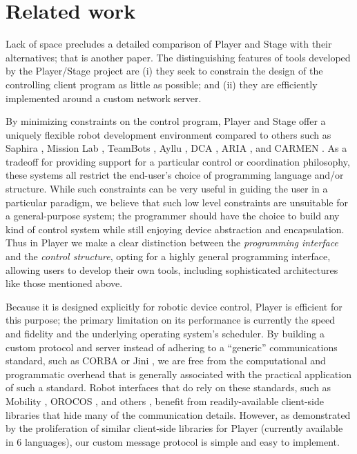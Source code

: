 \documentclass[a4paper]{ICAR2003}
\begin{document}
\section{Related work}
Lack of space precludes a detailed comparison of Player and Stage with
their alternatives; that is another paper. The distinguishing features of
tools developed by the Player/Stage project are (i) they seek to constrain
the design of the controlling client program as little as possible; and
(ii) they are efficiently implemented around a custom network server.

By minimizing constraints on the control program, Player and Stage offer a
uniquely flexible robot development environment compared to others such as
Saphira \cite{Konolige97}, Mission Lab \cite{MacKenzieArkinCameron97}, TeamBots
\cite{balch98}, Ayllu \cite{Werger00}, DCA \cite{PeterssonAustinChristensen01},
ARIA \cite{ARIA}, and CARMEN \cite{ThrunFoxBurgardDellaert01}.  As a tradeoff
for providing support for a particular control or coordination philosophy,
these systems all restrict the end-user's choice of programming language
and/or structure.  While such constraints can be very useful in guiding the
user in a particular paradigm, we believe that such low level constraints
are unsuitable for a general-purpose system; the programmer should have
the choice to build any kind of control system while still enjoying device
abstraction and encapsulation.  Thus in Player we make a clear distinction
between the {\sl programming interface} and the {\sl
  control structure}, opting for a highly general programming
interface, allowing users to develop their own tools, including sophisticated
architectures like those mentioned above.

Because it is designed explicitly for robotic device control, Player
is efficient for this purpose; the primary limitation on its
performance is currently the speed and fidelity and the underlying
operating system's scheduler.  By building a custom protocol and
server instead of adhering to a ``generic'' communications standard,
such as CORBA \cite{CORBA} or Jini \cite{Waldo99}, we are free from
the computational and programmatic overhead that is generally
associated with the practical application of such a standard.  Robot
interfaces that do rely on these standards, such as Mobility
\cite{mobility}, OROCOS \cite{orocos-web}, and others
\cite{BurchardFeddema96,Holness01}, benefit from readily-available
client-side libraries that hide many of the communication details.
However, as demonstrated by the proliferation of similar client-side
libraries for Player (currently available in 6 languages), our custom
message protocol is simple and easy to implement.
\end{document}
